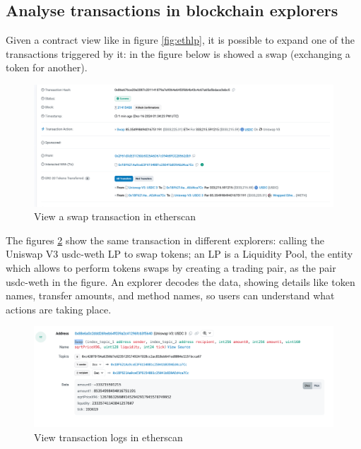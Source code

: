 \documentclass[11pt,a4paper,titlepage]{scrartcl}
\begin{document}
\subsection{Analyse transactions in blockchain explorers}

Given a contract view like in figure \ref{fig:ethlp}, it is possible to expand one of the  transactions triggered by it: in the figure below is showed a swap (exchanging a token for another).




\begin{figure}[ht]
    \includegraphics[width=1.0\textwidth]{image/explorers/transaction_swap.png}
    \caption{View a swap transaction in etherscan}
    \label{fig:etherscantx}
\end{figure}





The figures  \ref{fig:logseth} show the same transaction in different explorers: calling the Uniswap V3  usdc-weth LP  to swap tokens; an LP is a Liquidity Pool, the entity which allows to perform tokens swaps by creating a trading pair, as the pair usdc-weth in the figure.  An explorer decodes the data, showing details like token names, transfer amounts, and method names, so users can understand what actions are taking place.


\begin{figure}[ht]
    \includegraphics[width=1.0\textwidth]{image/explorers/swapLogs.png}
    \caption{View transaction logs in etherscan}
    \label{fig:logseth}
\end{figure}
\end{document}
